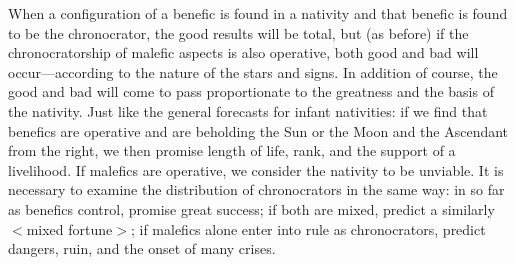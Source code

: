 When a configuration of a benefic is found in a nativity and that benefic is found to be the chronocrator, the good results will be total,
but (as before) if the chronocratorship of malefic aspects is also operative, both good and bad will occur—according to the nature of the stars and signs. In addition of course, the good and bad will come to pass proportionate to the greatness and the basis of the nativity. Just like the general forecasts for infant nativities: if we find that benefics are operative and are beholding the Sun or the Moon and the Ascendant from the right, we then promise length of life, rank, and the support of a livelihood. If malefics are operative, we consider the nativity to be unviable. It is necessary to examine the distribution of
chronocrators in the same way: in so far as benefics control, promise great success; if both are mixed, predict a similarly $<$mixed fortune$>$; if malefics alone enter into rule as chronocrators, predict dangers, ruin, and the onset of many crises.

